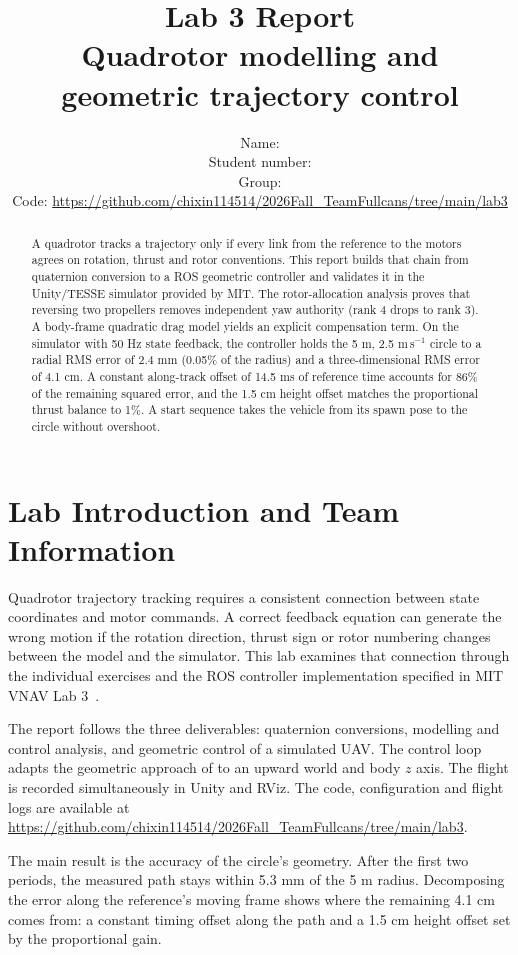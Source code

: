 \documentclass[12pt,a4paper,twoside]{article}
\title{Lab 3 Report\\[0.3em]\large Quadrotor modelling and geometric trajectory control}
\author{\small Name: \studentname\\[0.4em]\small Student number: \studentnumber\\[0.4em]\small Group: \labgroup\\[0.4em]\small Code: \url{https://github.com/chixin114514/2026Fall_TeamFullcans/tree/main/lab3}}
\date{}
\renewcommand{\abstractname}{Summary}
\begin{document}
\renewcommand{\abstractname}{Summary}
\maketitle
\begin{abstract}
A quadrotor tracks a trajectory only if every link from the reference to the motors agrees on rotation, thrust and rotor conventions. This report builds that chain from quaternion conversion to a ROS geometric controller and validates it in the Unity/TESSE simulator provided by MIT. The rotor-allocation analysis proves that reversing two propellers removes independent yaw authority (rank 4 drops to rank 3). A body-frame quadratic drag model yields an explicit compensation term. On the simulator with 50 Hz state feedback, the controller holds the 5 m, 2.5 m\,s$^{-1}$ circle to a radial RMS error of 2.4 mm (0.05\% of the radius) and a three-dimensional RMS error of 4.1 cm. A constant along-track offset of 14.5 ms of reference time accounts for 86\% of the remaining squared error, and the 1.5 cm height offset matches the proportional thrust balance to 1\%. A start sequence takes the vehicle from its spawn pose to the circle without overshoot.
\end{abstract}

\section{Lab Introduction and Team Information}
Quadrotor trajectory tracking requires a consistent connection between state coordinates and motor commands. A correct feedback equation can generate the wrong motion if the rotation direction, thrust sign or rotor numbering changes between the model and the simulator. This lab examines that connection through the individual exercises and the ROS controller implementation specified in MIT VNAV Lab 3~\citep{vnav}.

The report follows the three deliverables: quaternion conversions, modelling and control analysis, and geometric control of a simulated UAV. The control loop adapts the geometric approach of \citet{lee2010} to an upward world and body $z$ axis. The flight is recorded simultaneously in Unity and RViz. The code, configuration and flight logs are available at \url{https://github.com/chixin114514/2026Fall_TeamFullcans/tree/main/lab3}.

The main result is the accuracy of the circle's geometry. After the first two periods, the measured path stays within 5.3 mm of the 5 m radius. Decomposing the error along the reference's moving frame shows where the remaining 4.1 cm comes from: a constant timing offset along the path and a 1.5 cm height offset set by the proportional gain.
\end{document}
